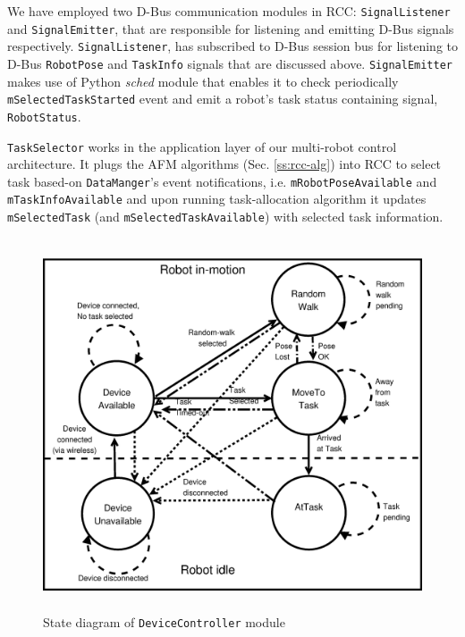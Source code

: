 \documentclass[final,5p,times,twocolumn]{elsarticle}
\begin{document}
We have employed two D-Bus communication modules in RCC: \texttt{SignalListener} and \texttt{SignalEmitter}, that are responsible for listening and emitting D-Bus signals respectively. \texttt{SignalListener}, has subscribed to D-Bus session bus for listening  to D-Bus \texttt{RobotPose} and \texttt{TaskInfo} signals that are discussed above. \texttt{SignalEmitter} makes use of Python {\em sched} module that enables it to check periodically \texttt{mSelectedTaskStarted} event and emit a robot's task status containing signal, \texttt{RobotStatus}. 

\texttt{TaskSelector} works in the application layer of our multi-robot control architecture. It plugs the AFM algorithms (Sec. \ref{ss:rcc-alg}) into RCC to select task based-on \texttt{DataManger}'s event notifications, i.e. \texttt{mRobotPoseAvailable} and \texttt{mTaskInfoAvailable} and upon running task-allocation algorithm it updates  \texttt{mSelectedTask} (and \texttt{mSelectedTaskAvailable}) with selected task information.
\begin{figure}
\centering
\includegraphics[width=0.7\linewidth,height=11cm]
{./images/rcc-device-controller-state.eps}
\caption{State diagram of \texttt{DeviceController} module}
\label{fig:dc-states} %
\end{figure}
\end{document}
